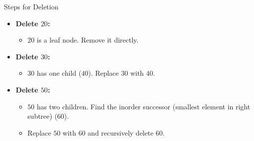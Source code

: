\begin{remarks}[]{Steps for Deletion}
    \begin{itemize}
        \item \textbf{Delete $20$:}
              \begin{itemize}
                  \item $20$ is a leaf node. Remove it directly.
              \end{itemize}
        \item \textbf{Delete $30$:}
              \begin{itemize}
                  \item $30$ has one child ($40$). Replace $30$ with $40$.
              \end{itemize}
        \item \textbf{Delete $50$:}
              \begin{itemize}
                  \item $50$ has two children. Find the inorder successor (smallest element in right subtree) ($60$).
                  \item Replace $50$ with $60$ and recursively delete $60$.
              \end{itemize}
    \end{itemize}
\end{remarks}


